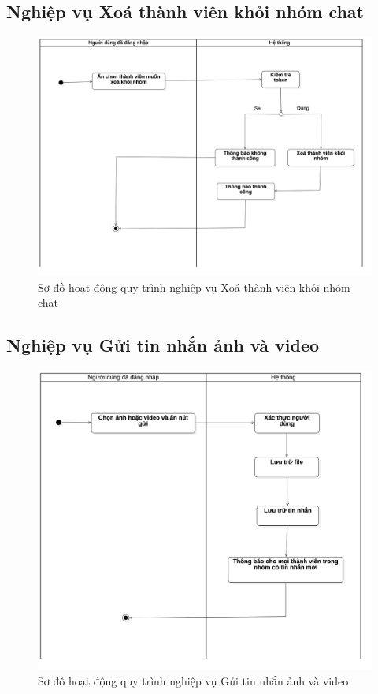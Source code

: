 \documentclass[../DoAn.tex]{subfiles}
\begin{document}
\subsection{Nghiệp vụ Xoá thành viên khỏi nhóm chat}
\begin{figure}[H]
   \centering
    \includegraphics[width=0.9\linewidth]{Hinhve/Activity/Activity_Xoa_Thanh_Vien_Khoi_Nhom_Chat.png}
    \caption{Sơ đồ hoạt động quy trình nghiệp vụ Xoá thành viên khỏi nhóm chat}
    \label{fig:dang_nhap}
\end{figure}
\hfill

\subsection{Nghiệp vụ Gửi tin nhắn ảnh và video}
\begin{figure}[H]
   \centering
    \includegraphics[width=1\linewidth]{Hinhve/Activity/Activity_Gui_Tin_Nhan_Anh_Va_Video.png}
    \caption{Sơ đồ hoạt động quy trình nghiệp vụ Gửi tin nhắn ảnh và video}
    \label{fig:dang_nhap}
\end{figure}
\hfill
\end{document}
